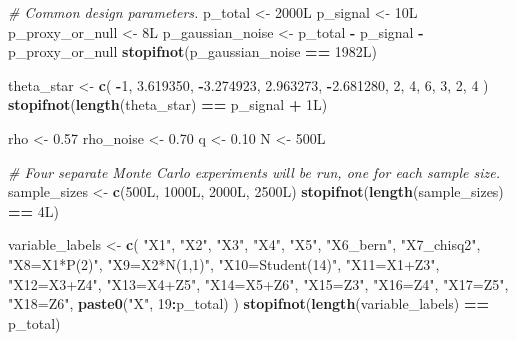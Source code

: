 \documentclass[
]{article}
\newenvironment{Shaded}{\begin{snugshade}}{\end{snugshade}}
\newcommand{\CommentTok}[1]{\textcolor[rgb]{0.56,0.35,0.01}{\textit{#1}}}
\newcommand{\DataTypeTok}[1]{\textcolor[rgb]{0.13,0.29,0.53}{#1}}
\newcommand{\DecValTok}[1]{\textcolor[rgb]{0.00,0.00,0.81}{#1}}
\newcommand{\FloatTok}[1]{\textcolor[rgb]{0.00,0.00,0.81}{#1}}
\newcommand{\FunctionTok}[1]{\textcolor[rgb]{0.13,0.29,0.53}{\textbf{#1}}}
\newcommand{\NormalTok}[1]{#1}
\newcommand{\OtherTok}[1]{\textcolor[rgb]{0.56,0.35,0.01}{#1}}
\newcommand{\SpecialCharTok}[1]{\textcolor[rgb]{0.81,0.36,0.00}{\textbf{#1}}}
\newcommand{\StringTok}[1]{\textcolor[rgb]{0.31,0.60,0.02}{#1}}
\begin{document}
\begin{Shaded}
\begin{Highlighting}[]
\CommentTok{\# Common design parameters.}
\NormalTok{p\_total }\OtherTok{\textless{}{-}} \DecValTok{2000}\DataTypeTok{L}
\NormalTok{p\_signal }\OtherTok{\textless{}{-}} \DecValTok{10}\DataTypeTok{L}
\NormalTok{p\_proxy\_or\_null }\OtherTok{\textless{}{-}} \DecValTok{8}\DataTypeTok{L}
\NormalTok{p\_gaussian\_noise }\OtherTok{\textless{}{-}}\NormalTok{ p\_total }\SpecialCharTok{{-}}\NormalTok{ p\_signal }\SpecialCharTok{{-}}\NormalTok{ p\_proxy\_or\_null}
\FunctionTok{stopifnot}\NormalTok{(p\_gaussian\_noise }\SpecialCharTok{==} \DecValTok{1982}\DataTypeTok{L}\NormalTok{)}

\NormalTok{theta\_star }\OtherTok{\textless{}{-}} \FunctionTok{c}\NormalTok{(}
  \SpecialCharTok{{-}}\DecValTok{1}\NormalTok{,}
  \FloatTok{3.619350}\NormalTok{, }\SpecialCharTok{{-}}\FloatTok{3.274923}\NormalTok{, }\FloatTok{2.963273}\NormalTok{, }\SpecialCharTok{{-}}\FloatTok{2.681280}\NormalTok{,}
  \DecValTok{2}\NormalTok{, }\DecValTok{4}\NormalTok{, }\DecValTok{6}\NormalTok{, }\DecValTok{3}\NormalTok{, }\DecValTok{2}\NormalTok{, }\DecValTok{4}
\NormalTok{)}
\FunctionTok{stopifnot}\NormalTok{(}\FunctionTok{length}\NormalTok{(theta\_star) }\SpecialCharTok{==}\NormalTok{ p\_signal }\SpecialCharTok{+} \DecValTok{1}\DataTypeTok{L}\NormalTok{)}

\NormalTok{rho }\OtherTok{\textless{}{-}} \FloatTok{0.57}
\NormalTok{rho\_noise }\OtherTok{\textless{}{-}} \FloatTok{0.70}
\NormalTok{q }\OtherTok{\textless{}{-}} \FloatTok{0.10}
\NormalTok{N }\OtherTok{\textless{}{-}} \DecValTok{500}\DataTypeTok{L}

\CommentTok{\# Four separate Monte Carlo experiments will be run, one for each sample size.}
\NormalTok{sample\_sizes }\OtherTok{\textless{}{-}} \FunctionTok{c}\NormalTok{(}\DecValTok{500}\DataTypeTok{L}\NormalTok{, }\DecValTok{1000}\DataTypeTok{L}\NormalTok{, }\DecValTok{2000}\DataTypeTok{L}\NormalTok{, }\DecValTok{2500}\DataTypeTok{L}\NormalTok{)}
\FunctionTok{stopifnot}\NormalTok{(}\FunctionTok{length}\NormalTok{(sample\_sizes) }\SpecialCharTok{==} \DecValTok{4}\DataTypeTok{L}\NormalTok{)}

\NormalTok{variable\_labels }\OtherTok{\textless{}{-}} \FunctionTok{c}\NormalTok{(}
  \StringTok{"X1"}\NormalTok{, }\StringTok{"X2"}\NormalTok{, }\StringTok{"X3"}\NormalTok{, }\StringTok{"X4"}\NormalTok{, }\StringTok{"X5"}\NormalTok{,}
  \StringTok{"X6\_bern"}\NormalTok{, }\StringTok{"X7\_chisq2"}\NormalTok{, }\StringTok{"X8=X1*P(2)"}\NormalTok{,}
  \StringTok{"X9=X2*N(1,1)"}\NormalTok{, }\StringTok{"X10=Student(14)"}\NormalTok{,}
  \StringTok{"X11=X1+Z3"}\NormalTok{, }\StringTok{"X12=X3+Z4"}\NormalTok{, }\StringTok{"X13=X4+Z5"}\NormalTok{, }\StringTok{"X14=X5+Z6"}\NormalTok{,}
  \StringTok{"X15=Z3"}\NormalTok{, }\StringTok{"X16=Z4"}\NormalTok{, }\StringTok{"X17=Z5"}\NormalTok{, }\StringTok{"X18=Z6"}\NormalTok{,}
  \FunctionTok{paste0}\NormalTok{(}\StringTok{"X"}\NormalTok{, }\DecValTok{19}\SpecialCharTok{:}\NormalTok{p\_total)}
\NormalTok{)}
\FunctionTok{stopifnot}\NormalTok{(}\FunctionTok{length}\NormalTok{(variable\_labels) }\SpecialCharTok{==}\NormalTok{ p\_total)}


\end{Highlighting}
\end{Shaded}
\end{document}

